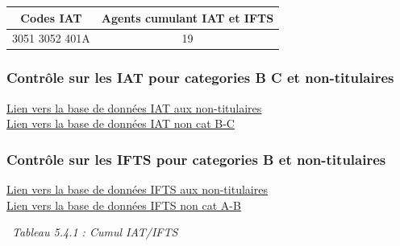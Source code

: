 \begin{longtable}[]{@{}cc@{}}
\toprule
Codes IAT & Agents cumulant IAT et IFTS\tabularnewline
\midrule
\endhead
3051 3052 401A & 19\tabularnewline
\bottomrule
\end{longtable}

\hypertarget{controle-sur-les-iat-pour-categories-b-c-et-non-titulaires}{%
\subsubsection{Contrôle sur les IAT pour categories B C et
non-titulaires}\label{controle-sur-les-iat-pour-categories-b-c-et-non-titulaires}}

\href{../Bases/Reglementation/IAT.non.tit.csv}{Lien vers la base de données
IAT aux non-titulaires}\\
\href{../Bases/Reglementation/IAT.non.catBC.csv}{Lien vers la base de
données IAT non cat B-C}

\hypertarget{controle-sur-les-ifts-pour-categories-b-et-non-titulaires}{%
\subsubsection{Contrôle sur les IFTS pour categories B et
non-titulaires}\label{controle-sur-les-ifts-pour-categories-b-et-non-titulaires}}

\href{../Bases/Reglementation/IFTS.non.tit.csv}{Lien vers la base de
données IFTS aux non-titulaires}\\
\href{../Bases/Reglementation/IFTS.non.catAB.csv}{Lien vers la base de
données IFTS non cat A-B}

~\emph{Tableau 5.4.1 : Cumul IAT/IFTS}

